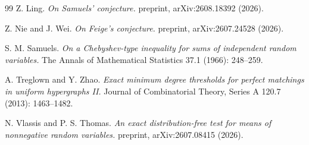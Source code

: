 \documentclass[10pt]{article}
\begin{document}
\begin{thebibliography}{99}
Z. Ling.
\emph{On Samuels' conjecture.}
preprint, arXiv:2608.18392 (2026).

Z. Nie and J. Wei.
\emph{On Feige's conjecture.}
preprint, arXiv:2607.24528 (2026).

S. M. Samuels.
\emph{On a Chebyshev-type inequality for sums of independent random variables.}
The Annals of Mathematical Statistics 37.1 (1966): 248--259.

A. Treglown and Y. Zhao.
\emph{Exact minimum degree thresholds for perfect matchings in uniform hypergraphs II.}
Journal of Combinatorial Theory, Series A 120.7 (2013): 1463--1482.

N. Vlassis and P. S. Thomas.
\emph{An exact distribution-free test for means of nonnegative random variables.}
preprint, arXiv:2607.08415 (2026).

\end{thebibliography}
\end{document}
